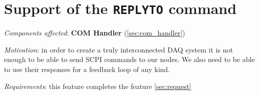 \section{Support of the \texttt{REPLYTO} command}
\label{sec:replyto}

\textit{Components affected}: \textbf{COM Handler} (\ref{sec:com_handler})

\textit{Motivation}: in order to create a truly interconnected DAQ system it is not enough to be able to send SCPI commands to our nodes. We also need to be able to use their responses for a feedback loop of any kind. 

\textit{Requirements}: this feature completes the feature \ref{sec:request}